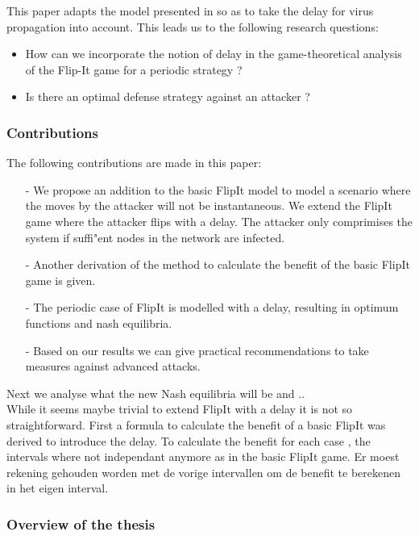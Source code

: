 This paper adapts the model presented in \cite{FlipIt} so as to take the delay for virus propagation into account.
This leads us to the following research questions:
\begin{itemize}
\item How can we incorporate the notion of delay in the game-theoretical analysis of the Flip-It game for a periodic strategy ?
\item Is there an optimal defense strategy against an attacker ? 
\end{itemize}



\subsubsection{Contributions}
The following contributions are made in this paper:
\begin{itemize}
\item[-] We propose an addition to the basic FlipIt model to model a scenario where the moves by the attacker will not be instantaneous. We extend the FlipIt game where the attacker flips with a delay. The attacker only comprimises the system if suffi"ent nodes in the network are infected. 
\item[-] Another derivation of the method to calculate the benefit of the basic FlipIt game is given.
\item[-] The periodic case of FlipIt is modelled with a delay, resulting in optimum functions and nash equilibria. 
\item[-] Based on our results we can give practical recommendations to take measures against advanced attacks. 
\end{itemize}
 Next we analyse what the new Nash equilibria will be and .. \\

While it seems maybe trivial to extend FlipIt with a delay it is not so straightforward. First a formula to calculate the benefit of a basic FlipIt was derived to introduce the delay. To calculate the benefit for each case , the intervals where not independant anymore as in the basic FlipIt game. Er moest rekening gehouden worden met de vorige intervallen om de benefit te berekenen in het eigen interval. 
\subsubsection{Overview of the thesis}

